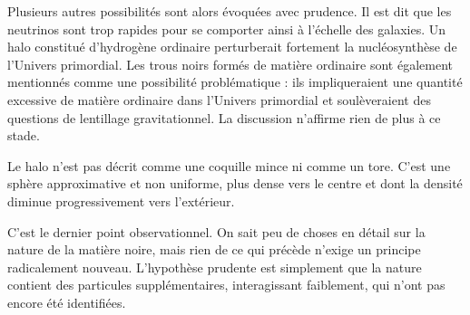 Plusieurs autres possibilités sont alors évoquées avec prudence. Il est dit que les neutrinos sont trop rapides pour se comporter ainsi à l’échelle des galaxies. Un halo constitué d’hydrogène ordinaire perturberait fortement la nucléosynthèse de l’Univers primordial. Les trous noirs formés de matière ordinaire sont également mentionnés comme une possibilité problématique : ils impliqueraient une quantité excessive de matière ordinaire dans l’Univers primordial et soulèveraient des questions de lentillage gravitationnel. La discussion n’affirme rien de plus à ce stade.

Le halo n’est pas décrit comme une coquille mince ni comme un tore. C’est une sphère approximative et non uniforme, plus dense vers le centre et dont la densité diminue progressivement vers l’extérieur.

\begin{classroomqa}
\end{classroomqa}

C’est le dernier point observationnel. On sait peu de choses en détail sur la nature de la matière noire, mais rien de ce qui précède n’exige un principe radicalement nouveau. L’hypothèse prudente est simplement que la nature contient des particules supplémentaires, interagissant faiblement, qui n’ont pas encore été identifiées.
